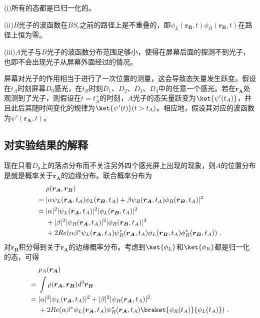 (i)所有的态都是已归一化的。

(ii)$B$光子的波函数在$BS_c$之前的路径上是不重叠的，即$\phi_L(\boldsymbol{r_B},t)\phi_R(\boldsymbol{r_B},t)$在路径上恒为零。

(iii)$A$光子与$B$光子的波函数分布范围足够小，使得在屏幕后面的探测不到光子，也即不会出现光子从屏幕外面经过的情况。


屏幕对光子的作用相当于进行了一次位置的测量，这会导致态矢量发生跃变。假设在$t_A$时刻屏幕$D_0$感光，在$t_B$时刻$D_1$、$D_2$、$D_3$、$D_4$中的任意一个感光。若在$\boldsymbol{r_A}$处观测到了光子，则假设在$t=t_A^+$的时刻，$A$光子的态矢量跃变为$\ket{\psi'(t_A)}$，并且此后其随时间变化的规律为$\ket{\psi'(t)}(t>t_A)$。相应地，假设其对应的波函数为$\psi'(\boldsymbol{r_A},t)$。

\subsection{对实验结果的解释}
现在只看$D_0$上的落点分布而不关注另外四个感光屏上出现的现象，则$A$的位置分布是就是概率关于$\boldsymbol{r_A}$的边缘分布。联合概率分布为
\begin{align}
&\rho(\boldsymbol{r_A},\boldsymbol{r_B}) \notag \\
={}&|\alpha\psi_L(\boldsymbol{r_A},t_A)\phi_L(\boldsymbol{r_B},t_A)+\beta\psi_R(\boldsymbol{r_A},t_A)\phi_R(\boldsymbol{r_B},t_A)|^2 \notag \\
={}&|\alpha|^2|\psi_L(\boldsymbol{r_A},t_A)|^2|\phi_L(\boldsymbol{r_B},t_A)|^2 \notag \\
&+|\beta|^2|\psi_R(\boldsymbol{r_A},t_A)|^2|\phi_R(\boldsymbol{r_B},t_A)|^2 \notag \\
&+2Re(\alpha\beta^*\psi_L(\boldsymbol{r_A},t_A)\psi_R^*(\boldsymbol{r_A},t_A)\phi_L(\boldsymbol{r_B},t_A)\phi_R^*(\boldsymbol{r_B},t_A))~.
\label{eq_DCQE_CombinedDistribution}
\end{align}
对$\boldsymbol{r_B}$积分得到关于$\boldsymbol{r_A}$的边缘概率分布。考虑到$\ket{\phi_L}$和$\ket{\phi_R}$都是归一化的态，可得
\begin{align}
&\rho_A(\boldsymbol{r_A}) \notag \\
={}&\int \rho(\boldsymbol{r_A},\boldsymbol{r_B})d^3\boldsymbol{r_B} \notag \\
={}&|\alpha|^2|\psi_L(\boldsymbol{r_A},t_A)|^2+|\beta|^2|\psi_R(\boldsymbol{r_A},t_A)|^2 \notag \\
&+2Re(\alpha\beta^*\psi_L(\boldsymbol{r_A},t_A)\psi_R^*(\boldsymbol{r_A},t_A)\braket{\phi_R(t_A)}{\phi_L(t_A)})~.
\end{align}
